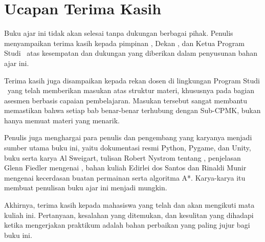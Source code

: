 
\chapter*{Ucapan Terima Kasih}
\thispagestyle{plain}

Buku ajar ini tidak akan selesai tanpa dukungan berbagai pihak. Penulis
menyampaikan terima kasih kepada pimpinan \NamaPT, Dekan \NamaFakultas,
dan Ketua Program Studi \NamaProdi\ atas kesempatan dan dukungan yang
diberikan dalam penyusunan bahan ajar ini.

Terima kasih juga disampaikan kepada rekan dosen di lingkungan Program
Studi \NamaProdi\ yang telah memberikan masukan atas struktur materi,
khususnya pada bagian asesmen berbasis capaian pembelajaran. Masukan
tersebut sangat membantu memastikan bahwa setiap bab benar-benar terhubung
dengan Sub-CPMK, bukan hanya memuat materi yang menarik.

Penulis juga menghargai para penulis dan pengembang yang karyanya menjadi
sumber utama buku ini, yaitu dokumentasi resmi Python, Pygame, dan Unity,
buku  serta  karya Al Sweigart, tulisan Robert Nystrom
tentang , penjelasan Glenn Fiedler mengenai
, bahan kuliah Edirlei dos Santos dan Rinaldi Munir
mengenai kecerdasan buatan permainan serta algoritma A*. Karya-karya itu
membuat penulisan buku ajar ini menjadi mungkin.

Akhirnya, terima kasih kepada mahasiswa yang telah dan akan mengikuti mata
kuliah ini. Pertanyaan, kesalahan yang ditemukan, dan kesulitan yang
dihadapi ketika mengerjakan praktikum adalah bahan perbaikan yang paling
jujur bagi buku ini.

\vspace{0.8cm}

\begin{flushright}
\BookAuthor
\end{flushright}

\clearpage
